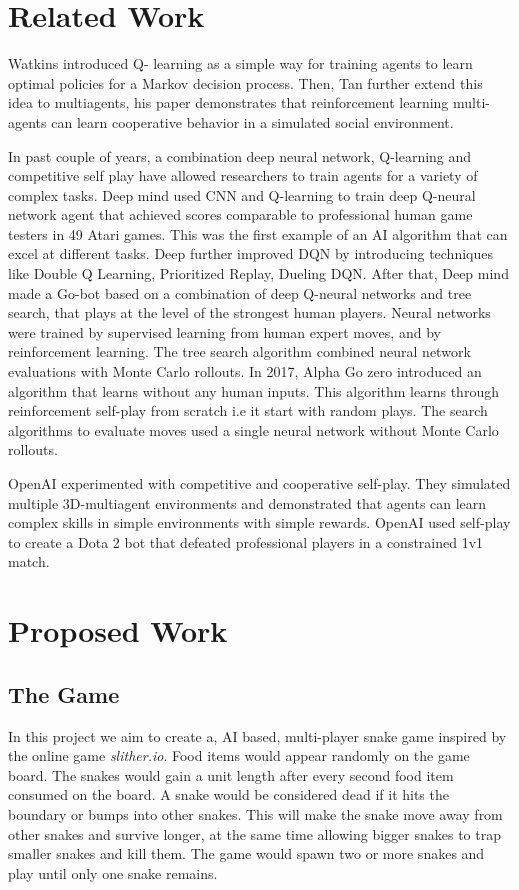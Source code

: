 \documentclass[conference]{IEEEtran}
\begin{document}
\section{Related Work}
Watkins\cite{sp1} introduced Q- learning as a simple way for training agents to learn
optimal policies for a Markov decision process. Then, Tan\cite{sp2} further extend
this idea to multiagents, his paper demonstrates that reinforcement learning
multi-agents can learn cooperative behavior in a simulated social environment.

In past couple of years, a combination deep neural network, Q-learning and
competitive self play have allowed researchers to train agents for a variety
of complex tasks. Deep mind\cite{sp3} used CNN and Q-learning to train deep Q-neural
network agent that achieved scores comparable to professional human game
testers in 49 Atari games. This was the first example of an AI algorithm
that can excel at different tasks. Deep further improved DQN by introducing
techniques like Double Q Learning\cite{sp4}, Prioritized Replay\cite{sp5}, Dueling DQN\cite{sp6}.  After
that, Deep mind made a Go-bot\cite{sp7} based on a combination of deep Q-neural
networks and tree search, that plays at the level of the strongest human
players. Neural networks were trained by supervised learning from human
expert moves, and by reinforcement learning. The tree search algorithm
combined neural network evaluations with Monte Carlo rollouts. In 2017, Alpha
Go zero\cite{sp8} introduced an algorithm that learns without any human inputs.
This algorithm learns through reinforcement self-play from scratch i.e it start
 with random plays. The search algorithms to evaluate moves used a single
 neural network without Monte Carlo rollouts.

OpenAI experimented with competitive and cooperative self-play\cite{sp9}. They simulated
multiple 3D-multiagent environments and demonstrated that agents can learn
complex skills in simple environments with simple rewards. OpenAI\cite{sp10} used
self-play to create a Dota 2 bot that defeated professional players in a
constrained 1v1 match.

\section{Proposed Work}
\subsection*{The Game}
In this project we aim to create a, AI based, multi-player snake game inspired by the online game \textit{slither.io}. Food items would appear randomly on the game board. The snakes would gain a unit length after every second food item consumed on the board. A snake would be considered dead if it hits the boundary or bumps into other snakes. This will make the snake move away from other snakes and survive longer, at the same time allowing bigger snakes to trap smaller snakes and kill them. The game would spawn two or more snakes and play until only one snake remains.\newline\par
\end{document}
